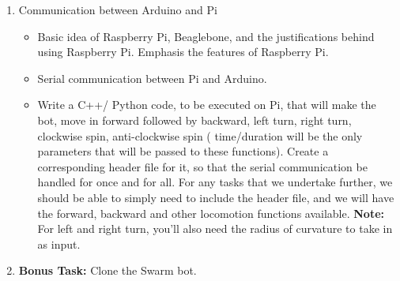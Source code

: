 \documentclass{article}
\begin{document}
\begin{enumerate}
\item Communication between Arduino and Pi
    \begin{itemize}
        \item Basic idea of Raspberry Pi, Beaglebone, and the justifications behind using Raspberry Pi. Emphasis the features of Raspberry Pi.
        \item Serial communication between Pi and Arduino.
        \item Write a C++/ Python code, to be executed on Pi, that will make the bot, move in forward followed by backward, left turn, right turn, clockwise spin, anti-clockwise spin ( time/duration will be the only parameters that will be passed to these functions). Create a corresponding header file for it, so that the serial communication be handled for once and for all. For any tasks that we undertake further, we should be able to simply need to include the header file, and we will have the forward, backward and other locomotion functions available.
        {\newline}{\newline}
        {\bf Note:} For left and right turn, you'll also need the radius of curvature to take in as input.
    \end{itemize}

\item {\bf Bonus Task:} Clone the Swarm bot.

\end{enumerate}%
\end{document}
